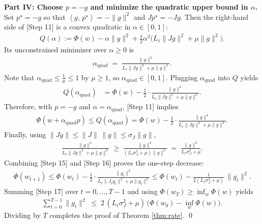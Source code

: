 \documentclass[11pt]{article}
\newcommand{\inner}[2]{\left\langle #1,\, #2 \right\rangle}
\begin{document}
\noindent\textbf{Part IV: Choose $p=-g$ and minimize the quadratic upper bound in $\alpha$.}
Set $p^\star=-g$ so that $\inner{g}{p^\star} = -\|g\|^2$ and $Jp^\star = -Jg$. Then the right-hand side of [Step 11] is a convex quadratic in $\alpha\in[0,1]$:
\begin{align}
Q(\alpha) := \Phi(w) - \alpha \|g\|^2 + \frac{1}{2}\alpha^2\Big(L_\ell \|J g\|^2 + \mu \|g\|^2\Big). \tag*{[Step 12]}
\end{align}
Its unconstrained minimizer over $\alpha\ge 0$ is
\begin{align}
\alpha_{\mathrm{quad}} \;=\; \frac{\|g\|^2}{L_\ell \|J g\|^2 + \mu \|g\|^2}. \tag*{[Step 13]: derivative zero condition}
\end{align}
Note that $\alpha_{\mathrm{quad}}\le \frac{1}{\mu}\le 1$ by $\mu\ge 1$, so $\alpha_{\mathrm{quad}}\in[0,1]$. Plugging $\alpha_{\mathrm{quad}}$ into $Q$ yields 
\begin{align}
Q(\alpha_{\mathrm{quad}}) 
&= \Phi(w) - \frac{1}{2}\cdot \frac{\|g\|^4}{L_\ell \|J g\|^2 + \mu \|g\|^2}. \tag*{[Step 14]: standard quadratic completion}
\end{align}
Therefore, with $p=-g$ and $\alpha=\alpha_{\mathrm{quad}}$, [Step 11] implies
\begin{align}
\Phi(w+\alpha_{\mathrm{quad}} p) \le Q(\alpha_{\mathrm{quad}}) 
= \Phi(w) - \frac{1}{2}\cdot \frac{\|g\|^4}{L_\ell \|J g\|^2 + \mu \|g\|^2}. \tag*{[Step 15]}
\end{align}
Finally, using $\|J g\|\le \|J\|\,\|g\| \le \sigma_J \|g\|$,
\begin{align}
\frac{\|g\|^4}{L_\ell \|J g\|^2 + \mu \|g\|^2} 
\;\ge\; \frac{\|g\|^4}{(L_\ell \sigma_J^2 + \mu)\|g\|^2}
\;=\; \frac{\|g\|^2}{L_\ell \sigma_J^2 + \mu}. \tag*{[Step 16]}
\end{align}
Combining [Step 15] and [Step 16] proves the one-step decrease:
\begin{align}
\Phi(w_{t+1}) \le \Phi(w_t) - \frac{1}{2}\cdot \frac{\|g_t\|^4}{L_\ell \|J_t g_t\|^2 + \mu \|g_t\|^2}
\le \Phi(w_t) - \frac{1}{2(L_\ell \sigma_J^2 + \mu)}\,\|g_t\|^2. \tag*{[Step 17]}
\end{align}
Summing [Step 17] over $t=0,\dots,T-1$ and using $\Phi(w_T)\ge \inf_w \Phi(w)$ yields
\begin{align}
\sum_{t=0}^{T-1}\|g_t\|^2 \;\le\; 2\,(L_\ell \sigma_J^2 + \mu)\,\big(\Phi(w_0)-\inf_w \Phi(w)\big). \tag*{[Step 18]}
\end{align}
Dividing by $T$ completes the proof of Theorem \ref{thm:rate}. \qed
\end{document}

